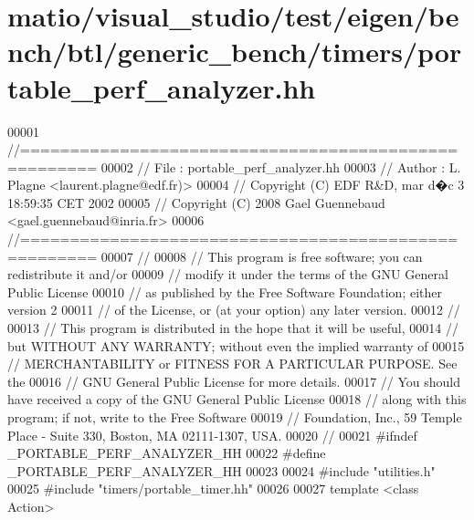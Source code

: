 \hypertarget{matio_2visual__studio_2test_2eigen_2bench_2btl_2generic__bench_2timers_2portable__perf__analyzer_8hh_source}{}\section{matio/visual\+\_\+studio/test/eigen/bench/btl/generic\+\_\+bench/timers/portable\+\_\+perf\+\_\+analyzer.hh}
\label{matio_2visual__studio_2test_2eigen_2bench_2btl_2generic__bench_2timers_2portable__perf__analyzer_8hh_source}

\begin{DoxyCode}
00001 \textcolor{comment}{//=====================================================}
00002 \textcolor{comment}{// File   :  portable\_perf\_analyzer.hh}
00003 \textcolor{comment}{// Author :  L. Plagne <laurent.plagne@edf.fr)>}
00004 \textcolor{comment}{// Copyright (C) EDF R&D,  mar d�c 3 18:59:35 CET 2002}
00005 \textcolor{comment}{// Copyright (C) 2008 Gael Guennebaud <gael.guennebaud@inria.fr>}
00006 \textcolor{comment}{//=====================================================}
00007 \textcolor{comment}{//}
00008 \textcolor{comment}{// This program is free software; you can redistribute it and/or}
00009 \textcolor{comment}{// modify it under the terms of the GNU General Public License}
00010 \textcolor{comment}{// as published by the Free Software Foundation; either version 2}
00011 \textcolor{comment}{// of the License, or (at your option) any later version.}
00012 \textcolor{comment}{//}
00013 \textcolor{comment}{// This program is distributed in the hope that it will be useful,}
00014 \textcolor{comment}{// but WITHOUT ANY WARRANTY; without even the implied warranty of}
00015 \textcolor{comment}{// MERCHANTABILITY or FITNESS FOR A PARTICULAR PURPOSE.  See the}
00016 \textcolor{comment}{// GNU General Public License for more details.}
00017 \textcolor{comment}{// You should have received a copy of the GNU General Public License}
00018 \textcolor{comment}{// along with this program; if not, write to the Free Software}
00019 \textcolor{comment}{// Foundation, Inc., 59 Temple Place - Suite 330, Boston, MA  02111-1307, USA.}
00020 \textcolor{comment}{//}
00021 \textcolor{preprocessor}{#ifndef \_PORTABLE\_PERF\_ANALYZER\_HH}
00022 \textcolor{preprocessor}{#define \_PORTABLE\_PERF\_ANALYZER\_HH}
00023 
00024 \textcolor{preprocessor}{#include "utilities.h"}
00025 \textcolor{preprocessor}{#include "timers/portable\_timer.hh"}
00026 
00027 \textcolor{keyword}{template} <\textcolor{keyword}{class} Action>

\end{DoxyCode}
